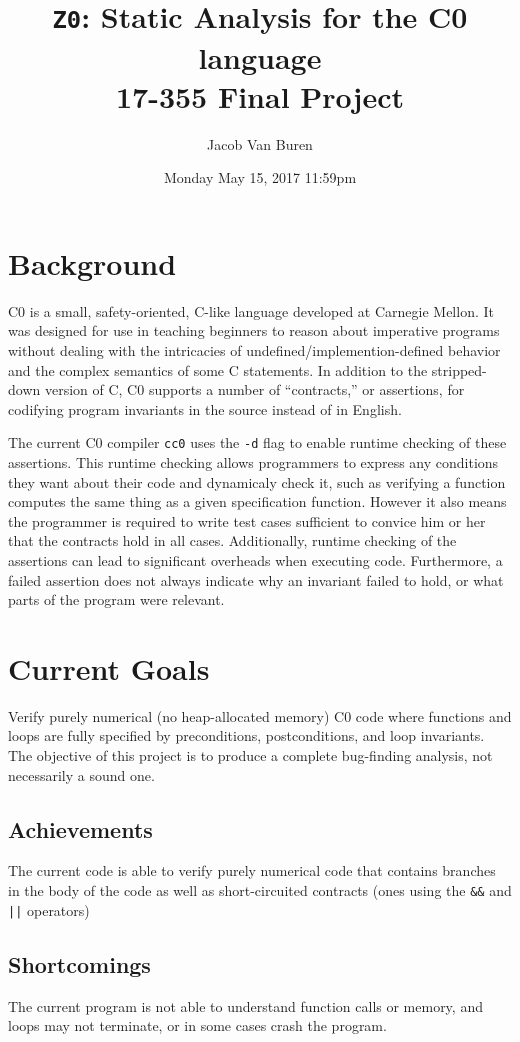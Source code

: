 \documentclass[12pt]{article}
\title{\texttt{Z0}: Static Analysis for the C0 language\\
{\normalsize 17-355 Final Project}}
\author{Jacob Van Buren}
\date{Monday May 15, 2017 11:59pm}
\begin{document}
\maketitle
\section{Background}
C0 is a small, safety-oriented, C-like language developed at Carnegie Mellon. It was designed for use in teaching beginners to reason about imperative programs without dealing  with the intricacies of undefined/implemention-defined behavior and the complex semantics of some C statements.
In addition to the stripped-down version of C, C0 supports a number of ``contracts,'' or assertions, for codifying program invariants in the source instead of in English.

The current C0 compiler \texttt{cc0} uses the \texttt{-d} flag to enable runtime checking of these assertions. This runtime checking allows programmers to express any conditions they want about their code and dynamicaly check it, such as verifying a function computes the same thing as a given specification function. However it also means the programmer is required to write test cases sufficient to convice him or her that the contracts hold in all cases. Additionally, runtime checking of the assertions can lead to significant overheads when executing code. Furthermore, a failed assertion does not always indicate why an invariant failed to hold, or what parts of the program were relevant.

\section{Current Goals}
Verify purely numerical (no heap-allocated memory) C0 code where functions and loops are fully specified by preconditions, postconditions, and loop invariants.
The objective of this project is to produce a complete bug-finding analysis, not necessarily a sound one.

\subsection{Achievements}
The current code is able to verify purely numerical code that contains branches in the body of the code as well as short-circuited contracts (ones using the \texttt{\&\&} and \texttt{||} operators)

\subsection{Shortcomings}
The current program is not able to understand function calls or memory, and loops may not terminate, or in some cases crash the program.
\end{document}
